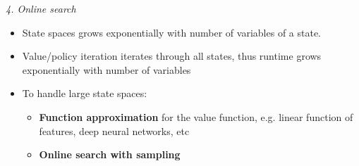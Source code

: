 \documentclass[12pt]{article}
\begin{document}
\noindent
\textsl{4. Online search}
\begin{itemize}
\item State spaces grows exponentially with number of variables of a state. 
\item Value/policy iteration iterates through all states, thus runtime grows exponentially with number of variables
\item To handle large state spaces: 
\begin{itemize}
\item \textbf{Function approximation} for the value function, e.g. linear function of features, deep neural networks, etc
\item \textbf{Online search with sampling}
\end{itemize}
\end{itemize}
\end{document}
